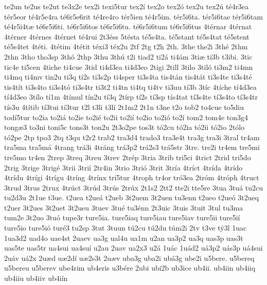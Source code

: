 {te2un
te2us
te2ut
te3x2e
tex2i
texi5tur
tex2^^ed
tex2o
tex2^^f3
tex2u
tex2^^fa
t^^e94r3ea
t^^e9r5eor
t^^e94r5e4ra
t^^e96r5e6rit
t^^e94re4ro
t^^e9r5ien
t^^e94r5im.
t^^e9r5i6ta.
t^^e9r5i6tae
t^^e9r5i6tam
t^^e94r5i4t^^e6
t^^e96r5i6ti.
t^^e96r5i6tos
t^^e96r5i6tu.
t^^e96r5i6tum
t^^e96r5i6tus
4t^^e9rnar
4t^^e9rnat
4t^^e9rner
4t^^e9rnes
4t^^e9rnet
t^^e94rui
2t3^^e9ss
5t^^e9sta
t^^e95s4ta.
t^^e95stant
t^^e95s4tat
t^^e95stent
t^^e95s4tet
4t^^e9ti.
4t^^e9tim
4t^^e9tit
t^^e9xi3
t^^e9x2u
2tf
2tg
t2h
2th.
3the
the2i
3th^^e9
2thm
2thn
3tho
tho3sp
3th^^f3
2thp
3thu
3th^^fa
t2i
tiad2
ti2^^e1
ti4^^e1m
3ti^^e6
ti3b
t3ibi.
3tic
tic4e
ti5cen
4tiche
ti4cue
3tid
ti4d3ea
ti4d3eo
2tigi
2till
3tilo
3til^^f3
ti3m2
ti4mn
ti4mq
ti4mv
tin2u
ti3q
ti2s
ti3s2p
ti4sper
ti3s4ta
tis4t^^e1n
tis4t^^e1t
ti3s4te
ti3s4t^^e9
tis4t^^edt
ti3s4to
ti3s4t^^f3
ti3s4tr
ti3t2
ti4tn
ti4tq
ti4tv
ti3uu
t^^ed3b
3t^^edc
4t^^edche
t^^ed4d3ea
t^^ed4d3eo
3t^^edlo
t^^ed1m
4t^^edmul
t^^edn2u
t^^ed3q
2t^^edrp
t^^ed2s
t^^ed3sp
t^^eds4tat
t^^ed3s4te
t^^ed3s4to
t^^ed3s4tr
t^^eds3u
4t^^edtib
t^^ed3tui
t^^ed3tur
t2l
t3li
t3l^^ed
2t1m2
2t1n
t3ne
t2o
tob2
to4cue
to5diu
tod^^ed5tur
to2ia
to2i^^e1
to2ie
to2i^^e9
to2ii
to2i^^ed
to2io
to2i^^f3
to2^^ed
tom2
tom4e
ton3g4
tong^^e63
to3ni
toni5c
tons3t
ton2u
2t3o2pe
tos3t
t^^f32cu
t^^f32ia
t^^f32ii
t^^f32io
2t^^f3lo
t^^f32pe
2tp
tpo3
2tq
t3qu
t2r2
trab2
tra3d4
trado3
tra3e4t
tra3g
tra3i
3tral
tr4am
tra5ma
tra5m^^e1
4trang
tr^^e13i
4tr^^e1ng
tr^^e13p2
tr^^e12s3
tr^^e15str
3tre.
tre2i
tr4em
tre5mi
tre5mo
tr4en
2trep
3treq
3treu
3trev
2tr^^e9p
3tria
3trib
tri5ci
4trict
2trid
tri5do
2trig
3trige
3trig^^e9
3trii
3tri^^ed
2tr4in
3trio
3tri^^f3
3trit
3tr^^eda
4tr^^edct
4tr^^edda
4tr^^eddo
4tr^^eddu
4tr^^edgi
4tr^^edgu
4tr^^edng
4tr^^ednx
tr^^ed5tur
4troph
tr4or
tr^^f33ea
2tr^^f3m
4tr^^f3ph
4truct
3trud
3trus
2trux
4tr^^fact
3tr^^fad
3tr^^fas
2tr^^fax
2t1s2
2tt2
tte2i
tte5re
3tua
3tu^^e1
tu2cu
tu2d3u
2t1ue
t3ue.
t2uea
t2ue^^e1
t2ueb
3t2uem
3t2uen
tu3enn
t2ueo
t2ue^^f3
3t2ueq
t2uer
3t2ues
3t2uet
3t2ueu
3tuev
3tu^^e9
tu3^^e9nn
2t3uic
3tuis
3tuit
3tul
tu3ma
tum2e
3t2uo
3tu^^f3
tupe3r
ture5ia.
ture5iaq
ture5iau
ture5iav
ture5ii
ture5i^^ed
ture5io
ture5i^^f3
tur^^e93
tu2sp
3tut
3tuun
t^^fa2cu
t^^fa2du
t^^fam2i
2tv
t3ve
t^^fd3l
1uac
1ua3d2
uad4o
uae4st
2uaev
ua3g
ual4u
ua1m
u2an
ua3p2
ua3q
uas3p
uas3t
uas5te
uas5tr
ua4sui
ua4su^^ed
u2au
2uav
ua2x3
u2^^e1
1u^^e1c
1u^^e1d2
u^^e13p2
u^^e1s3p
u^^e14sui
2u^^e1v
u^^e12x
2u^^e6d
u^^e62d^^ed
u^^e62s3t
2u^^e6v
uba3g
uba2i
ub^^e13g
ube2i
u5bere.
u5bereq
u5bereu
u5berev
ube4rim
ub4eris
u3b^^e9re
2ubi
ubi2b
ub3ice
ub4ii.
ub4iin
ub4iiq
ub4iiu
ub4iiv
ub4i^^edn
}
